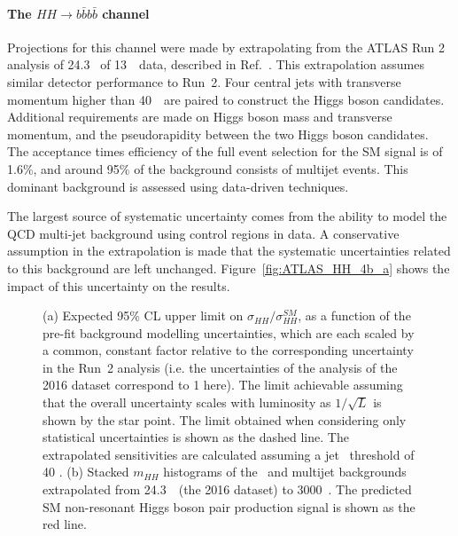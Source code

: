 %
\paragraph{The $HH \rightarrow b\bar{b}b\bar{b}$ channel}

Projections for this channel were made by extrapolating from the ATLAS Run 2 analysis of 24.3 \fbinv\ of 13~\TeV\ data, described in Ref.~\cite{ITKPixelTDR}. This extrapolation assumes similar detector performance to Run~2. Four central jets with transverse momentum higher than 40~\GeV\ are paired to construct the Higgs boson candidates. Additional requirements are made on Higgs boson mass and transverse momentum, and the pseudorapidity between the two Higgs boson candidates.
The acceptance times efficiency of the full event selection for the SM signal is of 1.6\%, and around 95\% of the background consists of multijet events. This dominant background is assessed using data-driven techniques. 

The largest source of systematic uncertainty comes from the ability to model the QCD multi-jet background using control regions in data. A conservative assumption in the extrapolation is made that the systematic uncertainties related to this background are left unchanged. Figure~\ref{fig:ATLAS_HH_4b_a} shows the impact of this uncertainty on the results.


\begin{figure}[!htb]
\centering 
{} 
\caption{(a) Expected 95\% CL upper limit on $\sigma_{HH}/\sigma_{HH}^{SM}$, as a function of the pre-fit background modelling uncertainties, which are each scaled by a common, constant factor relative to the corresponding uncertainty in the Run~2 analysis (i.e. the uncertainties of the analysis of the 2016 dataset correspond to 1 here). 
The limit achievable assuming that the overall uncertainty scales with luminosity as $1/\sqrt L$ is shown by the star point.
The limit obtained when considering only statistical uncertainties is shown as the dashed line.
The extrapolated sensitivities are calculated assuming a jet \pt\ threshold of 40 \GeV.
(b) Stacked $m_{HH}$ histograms of the \ttbar\ and multijet backgrounds extrapolated from 24.3~\fbinv\ (the 2016 dataset) to 3000~\fbinv.
The predicted SM non-resonant Higgs boson pair production signal is shown as the red line.} 
\label{fig:ATLAS_HH_4b} 
\end{figure}

